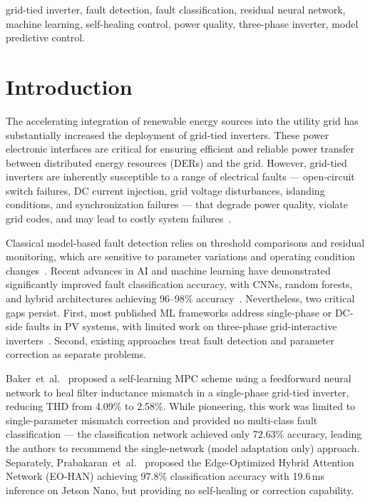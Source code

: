 \documentclass[conference]{IEEEtran}
\begin{document}
\begin{IEEEkeywords}
grid-tied inverter, fault detection, fault classification, residual neural
network, machine learning, self-healing control, power quality, three-phase
inverter, model predictive control.
\end{IEEEkeywords}

\section{Introduction}

The accelerating integration of renewable energy sources into the utility grid
has substantially increased the deployment of grid-tied inverters. These power
electronic interfaces are critical for ensuring efficient and reliable power
transfer between distributed energy resources (DERs) and the grid. However,
grid-tied inverters are inherently susceptible to a range of electrical
faults --- open-circuit switch failures, DC current injection, grid voltage
disturbances, islanding conditions, and synchronization failures --- that
degrade power quality, violate grid codes, and may lead to costly system
failures~\cite{vazquez2014, amiri2024}.

Classical model-based fault detection relies on threshold comparisons and
residual monitoring, which are sensitive to parameter variations and operating
condition changes~\cite{sun2023}. Recent advances in AI and machine learning
have demonstrated significantly improved fault classification accuracy, with
CNNs, random forests, and hybrid architectures achieving 96--98\%
accuracy~\cite{yan2023, bhadra2025}. Nevertheless, two critical gaps persist.
First, most published ML frameworks address single-phase or DC-side faults in
PV systems, with limited work on three-phase grid-interactive
inverters~\cite{you2023}. Second, existing approaches treat fault detection and
parameter correction as separate problems.

Baker~et~al.~\cite{baker2021} proposed a self-learning MPC scheme using a
feedforward neural network to heal filter inductance mismatch in a
single-phase grid-tied inverter, reducing THD from 4.09\% to 2.58\%. While
pioneering, this work was limited to single-parameter mismatch correction and
provided no multi-class fault classification --- the classification network
achieved only 72.63\% accuracy, leading the authors to recommend the
single-network (model adaptation only) approach. Separately,
Prabakaran~et~al.~\cite{prabakaran2026} proposed the Edge-Optimized Hybrid
Attention Network (EO-HAN) achieving 97.8\% classification accuracy with
19.6\,ms inference on Jetson Nano, but providing no self-healing or
correction capability.
\end{document}
